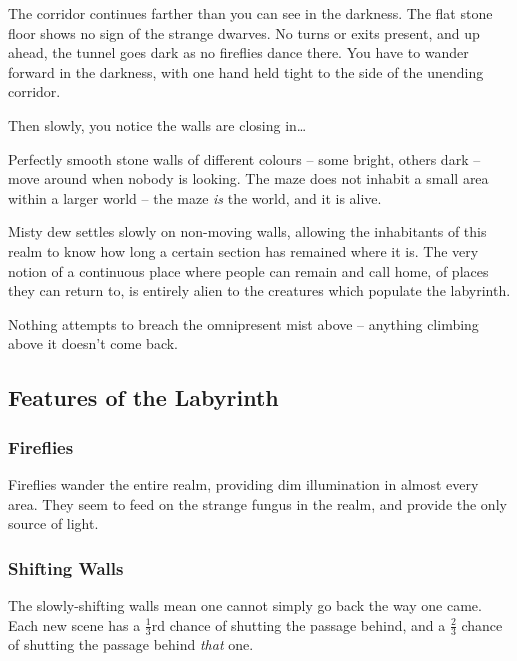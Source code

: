 \begin{multicols}{2}

\begin{boxtext}
  The corridor continues farther than you can see in the darkness.
  The flat stone floor shows no sign of the strange dwarves.
  No turns or exits present, and up ahead, the tunnel goes dark as no fireflies dance there.
  You have to wander forward in the darkness, with one hand held tight to the side of the unending corridor.

  Then slowly, you notice the walls are closing in\ldots

\end{boxtext}

\noindent
Perfectly smooth stone walls of different colours -- some bright, others dark -- move around when nobody is looking.
The maze does not inhabit a small area within a larger world -- the maze \emph{is} the world, and it is alive.

Misty dew settles slowly on non-moving walls, allowing the inhabitants of this realm to know how long a certain section has remained where it is.
The very notion of a continuous place where people can remain and call home, of places they can return to, is entirely alien to the creatures which populate the labyrinth.

Nothing attempts to breach the omnipresent mist above -- anything climbing above it doesn't come back.

\encLabyrinth

\subsection{Features of the Labyrinth}

\subsubsection{Fireflies}

Fireflies wander the entire realm, providing dim illumination in almost every area.
They seem to feed on the strange fungus in the realm, and provide the only source of light.

\subsubsection{Shifting Walls}

The slowly-shifting walls mean one cannot simply go back the way one came.
Each new scene has a $\frac{1}{3}$rd chance of shutting the passage behind, and a $\frac{2}{3}$ chance of shutting the passage behind \emph{that} one.


\end{multicols}

